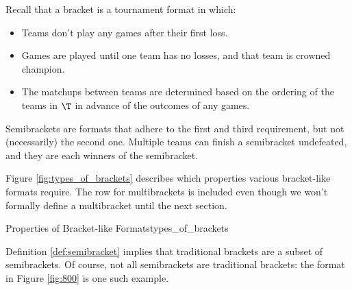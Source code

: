 {    Recall that a bracket is a tournament format in which:
    \begin{itemize}
        \item Teams don't play any games after their first loss.
        \item Games are played until one team has no losses, and that team is crowned champion.
        \item The matchups between teams are determined based on the ordering of the teams in $\T$ in advance of the outcomes of any games.
    \end{itemize}

    Semibrackets are formats that adhere to the first and third requirement, but not (necessarily) the second one. Multiple teams can finish a semibracket undefeated, and they are each winners of the semibracket.

    Figure \ref{fig:types_of_brackets} describes which properties various bracket-like formats require. The row for multibrackets is included even though we won't formally define a multibracket until the next section.

    \begin{figg}{Properties of Bracket-like Formats}{types_of_brackets}
        \begin{center}
        \end{center}
    \end{figg} 

    Definition \ref{def:semibracket} implies that traditional brackets are a subset of semibrackets. Of course, not all semibrackets are traditional brackets: the format in Figure \ref{fig:800} is one such example.

}
